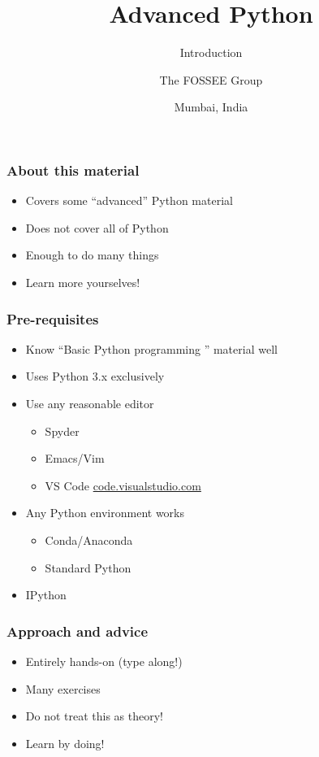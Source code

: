 \documentclass[14pt,compress,aspectratio=169]{beamer}
\title[Introduction]{Advanced Python}
\subtitle{Introduction}
\author[FOSSEE] {The FOSSEE Group}
\institute[IIT Bombay] {Department of Aerospace Engineering\\IIT Bombay}
\date[] {Mumbai, India}
\begin{document}
\begin{frame}
  \titlepage
\end{frame}

\begin{frame}
  \frametitle{About this material}
  \begin{itemize}
  \item Covers some ``advanced'' Python material
  \item Does not cover all of Python
  \item Enough to do many things
    \vspace*{0.5in}
  \item Learn more yourselves!
  \end{itemize}
\end{frame}

\begin{frame}
  \frametitle{Pre-requisites}
  \begin{itemize}
  \item Know ``Basic Python programming '' material well
  \item Uses Python 3.x exclusively
  \item Use any reasonable editor
    \begin{itemize}
    \item Spyder
    \item Emacs/Vim
    \item VS Code \url{code.visualstudio.com}
    \end{itemize}
  \item Any Python environment works
    \begin{itemize}
    \item Conda/Anaconda
    \item Standard Python
    \end{itemize}
  \item IPython
  \end{itemize}
\end{frame}

\begin{frame}
  \frametitle{Approach and advice}
  \begin{itemize}
  \item Entirely hands-on (type along!)
  \item Many exercises
  \item Do not treat this as theory!
  \item \alert{Learn by doing!}
  \end{itemize}
\end{frame}
\end{document}
